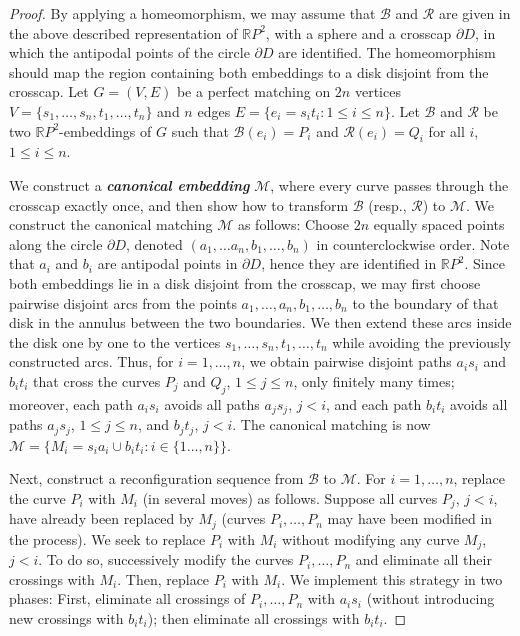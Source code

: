 \documentclass[a4paper,USenglish,cleveref,colorlinks=true,urlcolor=black,linkcolor=black,citecolor=black,thm-restate,authorcolumns]{lipics-v2021}
\theoremstyle{claimstyle}
\def\defn#1{\textit{\textbf{\boldmath #1}}}
\renewcommand{\emph}[1]{\defn{#1}}
\begin{document}
\begin{proof}
    By applying a homeomorphism, we may assume that $\mathcal{B}$ and $\mathcal{R}$ are given in the above described representation of $\mathbb{R}P^2$, with a sphere and a crosscap $\partial D$, in which the antipodal points of the circle $\partial D$ are identified.
    The homeomorphism should map the region containing both embeddings to a disk disjoint from the crosscap. Let $G=(V,E)$ be a perfect matching on $2n$ vertices $V=\{s_1,\ldots,s_n,t_1,\ldots,t_n\}$ and $n$ edges $E=\{e_i=s_it_i: 1\leq i\leq n\}$. Let $\mathcal{B}$ and $\mathcal{R}$ be two $\mathbb{R}P^2$-embeddings of $G$ such that $\mathcal{B}(e_i)=P_i$ and $\mathcal{R}(e_i)=Q_i$ for  all $i$, $1\leq i\leq n$.

    We construct a \emph{canonical embedding} $\mathcal{M}$, where every curve passes through the crosscap exactly once, and then show how to transform $\mathcal{B}$ (resp., $\mathcal{R}$) to $\mathcal{M}$.
    We construct the canonical matching $\mathcal{M}$ as follows: Choose $2n$ equally spaced points along the circle $\partial D$, denoted $(a_1,\ldots a_n,b_1,\ldots, b_n)$ in counterclockwise order. Note that $a_i$ and $b_i$ are antipodal points in $\partial D$, hence they are identified in $\mathbb{R}P^2$.
    Since both embeddings lie in a disk disjoint from the crosscap, we may first choose pairwise disjoint arcs from the points $a_1,\ldots,a_n,b_1,\ldots,b_n$ to the boundary of that disk in the annulus between the two boundaries.
    We then extend these arcs inside the disk one by one to the vertices $s_1,\ldots,s_n,t_1,\ldots,t_n$ while avoiding the previously constructed arcs.
    Thus, for $i=1,\ldots,n$, we obtain pairwise disjoint paths $a_is_i$ and $b_it_i$ that cross the curves $P_j$ and $Q_j$, $1\leq j\leq n$, only finitely many times; moreover, each path $a_is_i$ avoids all paths $a_js_j$, $j<i$, and each path $b_it_i$ avoids all paths $a_js_j$, $1\leq j\leq n$, and $b_jt_j$, $j<i$.
    The canonical matching is now $\mathcal{M}=\{ M_i= s_ia_i\cup b_it_i\colon i\in \{1\ldots , n\}\}$.

    Next, construct a reconfiguration sequence from $\mathcal{B}$ to $\mathcal{M}$. For $i=1,\ldots, n$, replace the curve $P_i$ with $M_i$ (in several moves) as follows. Suppose all curves $P_j$, $j<i$, have already been replaced by $M_j$ (curves $P_i,\ldots, P_n$ may have been modified in the process). We seek to replace $P_i$ with $M_i$ without modifying any curve $M_j$, $j<i$.
    To do so, successively modify the curves $P_i,\ldots , P_n$ and eliminate all their crossings with $M_i$. Then, replace $P_i$ with $M_i$.
    We implement this strategy in two phases: First, eliminate all crossings of  $P_i,\ldots , P_n$ with $a_is_i$ (without introducing new crossings with $b_it_i$); then eliminate all crossings with $b_it_i$.


\end{proof}
\end{document}
